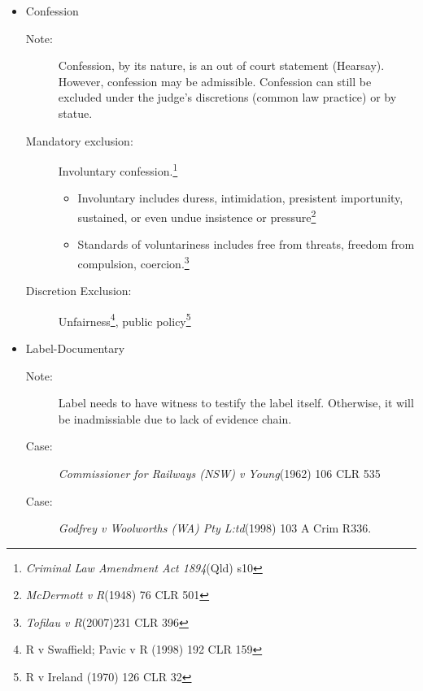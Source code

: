 \begin{itemize}
        \item Confession
        		\begin{description}
			\item[Note:] Confession, by its nature, is an out of court statement (Hearsay). However, confession may be admissible. Confession can still be excluded under the judge's discretions (common law practice) or by statue.
			\item[Mandatory exclusion:] Involuntary confession.\footnote{ \textit{ Criminal Law Amendment Act 1894}(Qld) s10}
				\begin{itemize}
					\item Involuntary includes duress, intimidation, presistent importunity, sustained, or even undue insistence or pressure\footnote{ \textit{McDermott v R}(1948) 76 CLR 501}
					\item Standards of voluntariness includes free from threats, freedom from compulsion, coercion.\footnote{\textit{Tofilau v R}(2007)231 CLR 396}
				\end{itemize}
			\item[Discretion Exclusion:] Unfairness\footnote{R v Swaffield; Pavic v R (1998) 192 CLR 159}, public policy\footnote{R v Ireland (1970) 126 CLR 32}
		\end{description}
	\item Label-Documentary
		\begin{description}
			\item[Note:] Label needs to have witness to testify the label itself. Otherwise, it will be inadmissiable due to lack of evidence chain. 
			\item[Case:] \textit{Commissioner for Railways (NSW) v Young}(1962) 106 CLR 535
			\item[Case:] \textit{Godfrey v Woolworths (WA) Pty L:td}(1998) 103 A Crim R336.
		\end{description}
	

\end{itemize}
